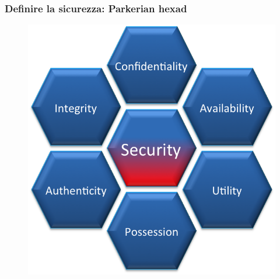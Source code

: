 \begin{frame}
  \frametitle{Definire la sicurezza: Parkerian hexad}
  	\begin{figure}[h] 
		\includegraphics[scale=0.45]{imgs/hexad.png}
	\end{figure}
\end{frame}

